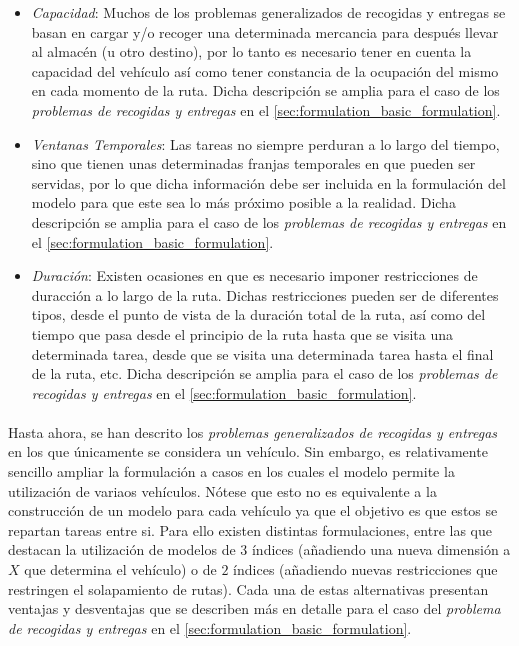 \documentclass{subfiles}
\begin{document}
        \begin{itemize}

          \item \emph{Capacidad}: Muchos de los problemas generalizados de recogidas y entregas se basan en cargar y/o recoger una determinada mercancia para después llevar al almacén (u otro destino), por lo tanto es necesario tener en cuenta la capacidad del vehículo así como tener constancia de la ocupación del mismo en cada momento de la ruta. Dicha descripción se amplia para el caso de los \emph{problemas de recogidas y entregas} en el \cref{sec:formulation_basic_formulation}.

          \item \emph{Ventanas Temporales}: Las tareas no siempre perduran a lo largo del tiempo, sino que tienen unas determinadas franjas temporales en que pueden ser servidas, por lo que dicha información debe ser incluida en la formulación del modelo para que este sea lo más próximo posible a la realidad. Dicha descripción se amplia para el caso de los \emph{problemas de recogidas y entregas} en el \cref{sec:formulation_basic_formulation}.

          \item \emph{Duración}: Existen ocasiones en que es necesario imponer restricciones de duracción a lo largo de la ruta. Dichas restricciones pueden ser de diferentes tipos, desde el punto de vista de la duración total de la ruta, así como del tiempo que pasa desde el principio de la ruta hasta que se visita una determinada tarea, desde que se visita una determinada tarea hasta el final de la ruta, etc. Dicha descripción se amplia para el caso de los \emph{problemas de recogidas y entregas} en el \cref{sec:formulation_basic_formulation}.

        \end{itemize}

        \paragraph{}
        Hasta ahora, se han descrito los \emph{problemas generalizados de recogidas y entregas} en los que únicamente se considera un vehículo. Sin embargo, es relativamente sencillo ampliar la formulación a casos en los cuales el modelo permite la utilización de variaos vehículos. Nótese que esto no es equivalente a la construcción de un modelo para cada vehículo ya que el objetivo es que estos se repartan tareas entre si. Para ello existen distintas formulaciones, entre las que destacan la utilización de modelos de $3$ índices (añadiendo una nueva dimensión a $X$ que determina el vehículo) o de $2$ índices (añadiendo nuevas restricciones que restringen el solapamiento de rutas). Cada una de estas alternativas presentan ventajas y desventajas que se describen más en detalle para el caso del \emph{problema de recogidas y entregas} en el \cref{sec:formulation_basic_formulation}.
\end{document}
